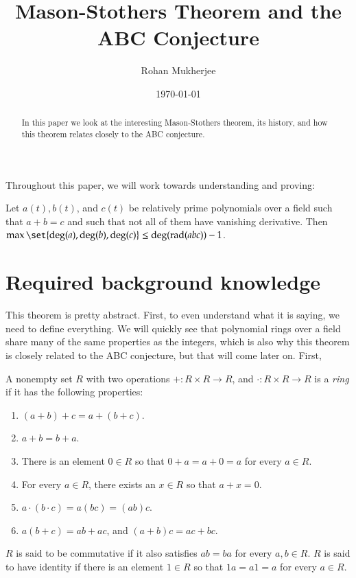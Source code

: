\documentclass[12pt]{article}
\title{Mason-Stothers Theorem and the ABC Conjecture}
\date{\today}
\author{Rohan Mukherjee}
\newenvironment{theorem}{\begin{mytheorem}}{\end{mytheorem}}
\theoremstyle{definitionstyle}
\newenvironment{definition}{\begin{mydef}}{\end{mydef}}
\begin{document}
\maketitle

\begin{abstract}
	In this paper we look at the interesting Mason-Stothers theorem, its history, and how this theorem relates closely to the ABC conjecture.
\end{abstract}

Throughout this paper, we will work towards understanding and proving:
\begin{theorem}[Mason-Stothers]
	Let $a(t), b(t)$, and $c(t)$ be relatively prime polynomials over a field such that $a+b = c$ and such that not all of them have vanishing derivative. Then $\max\set{\deg(a), \deg(b), \deg(c)} \leq \deg(\mathrm{rad}(abc)) - 1$.
\end{theorem}

\section{Required background knowledge}

This theorem is pretty abstract. First, to even understand what it is saying, we need to define everything. We will quickly see that polynomial rings over a field share many of the same properties as the integers, which is also why this theorem is closely related to the ABC conjecture, but that will come later on. First,
\begin{definition}
	A nonempty set $R$ with two operations $+: R \times R \to R$, and $\cdot : R \times R \to R$ is a \textit{ring} if it has the following properties:
	\begin{enumerate}[label=(\roman*)]
		\item $(a+b)+c = a+(b+c)$.
		\item $a+b = b+a$.
		\item There is an element $0 \in R$ so that $0 + a = a + 0 = a$ for every $a \in R$.
		\item For every $a \in R$, there exists an $x \in R$ so that $a + x = 0$.
		\item $a \cdot (b \cdot c) = a(bc) = (ab)c$. 
		\item $a(b+c) = ab + ac$, and $(a+b)c = ac + bc$.
	\end{enumerate}
	$R$ is said to be commutative if it also satisfies $ab = ba$ for every $a, b \in R$. $R$ is said to have identity if there is an element $1 \in R$ so that $1a = a1 = a$ for every $a \in R$.
\end{definition}
\end{document}
